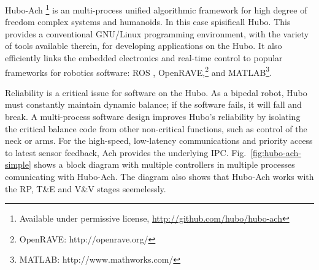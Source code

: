 Hubo-Ach \footnote{Available under permissive license,
  \url{http://github.com/hubo/hubo-ach}} is an multi-process unified algorithmic framework for high degree of freedom complex systems and humanoids.
In this case spisificall Hubo.  This provides a conventional GNU/Linux
programming environment, with the variety of tools available therein,
for developing applications on the Hubo.  It also efficiently links
the embedded electronics and real-time control to popular frameworks
for robotics software: ROS \cite{Quigley09},
OpenRAVE,\footnote{OpenRAVE: http://openrave.org/} and
MATLAB\footnote{MATLAB: http://www.mathworks.com/}.


Reliability is a critical issue for software on the Hubo.  As a
bipedal robot, Hubo must constantly maintain dynamic balance; if the
software fails, it will fall and break.  A multi-process software
design improves Hubo's reliability by isolating the critical balance
code from other non-critical functions, such as control of the neck or
arms.  For the high-speed, low-latency communications and priority
access to latest sensor feedback, Ach provides the underlying IPC.
Fig.~\ref{fig:hubo-ach-simple} shows a block diagram with multiple controllers in multiple processes comunicating with Hubo-Ach.
The diagram also shows that Hubo-Ach works with the RP, T\&E and V\&V stages seemelessly.



